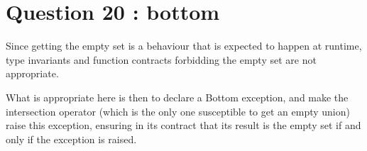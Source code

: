 \section{Question 20 : bottom}

Since getting the empty set is a behaviour that is expected to happen at runtime,
type invariants and function contracts forbidding the empty set are not appropriate.

What is appropriate here is then to declare a Bottom exception, and make the
intersection operator (which is the only one susceptible to get an empty union) raise
this exception, ensuring in its contract that its result is the empty set if and only
if the exception is raised.
